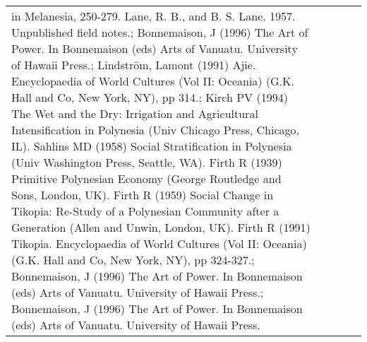 \begin{longtable}{p{2cm}p{2cm}p{2cm}p{5cm}p{7cm}}
in Melanesia, 250-279. Lane, R. B., and B. S. Lane. 1957. Unpublished field notes.; Bonnemaison, J (1996) The Art of Power. In Bonnemaison (eds) Arts of Vanuatu. University of Hawaii Press.; Lindström, Lamont (1991) Ajie. Encyclopaedia of World Cultures (Vol II: Oceania) (G.K. Hall and Co, New York, NY), pp 314.; Kirch PV (1994) The Wet and the Dry: Irrigation and Agricultural Intensification in Polynesia (Univ Chicago Press, Chicago, IL). Sahlins MD (1958) Social Stratification in Polynesia (Univ Washington Press, Seattle, WA). Firth R (1939) Primitive Polynesian Economy (George Routledge and Sons, London, UK). Firth R (1959) Social Change in Tikopia: Re-Study of a Polynesian Community after a Generation (Allen and Unwin, London, UK). Firth R (1991) Tikopia. Encyclopaedia of World Cultures (Vol II: Oceania) (G.K. Hall and Co, New York, NY), pp 324-327.; Bonnemaison, J (1996) The Art of Power. In Bonnemaison (eds) Arts of Vanuatu. University of Hawaii Press.; Bonnemaison, J (1996) The Art of Power. In Bonnemaison (eds) Arts of Vanuatu. University of Hawaii Press. \\ 

\end{longtable}
